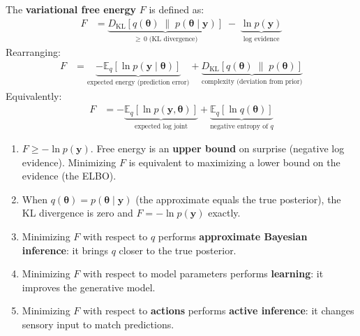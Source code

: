 \documentclass[11pt,a4paper]{report}
\begin{document}
\begin{definitionbox}
The \textbf{variational free energy} $F$ is defined as:
\begin{align}
  F &= \underbrace{D_{\mathrm{KL}}\!\left[q(\boldsymbol{\theta}) \;\|\; p(\boldsymbol{\theta} \mid \mathbf{y})\right]}_{\geq\, 0\; \text{(KL divergence)}} \;-\; \underbrace{\ln p(\mathbf{y})}_{\text{log evidence}} \label{eq:fe_def}
\end{align}
Rearranging:
\begin{align}
  F &= \underbrace{-\mathbb{E}_{q}\!\left[\ln p(\mathbf{y} \mid \boldsymbol{\theta})\right]}_{\text{expected energy (prediction error)}} + \underbrace{D_{\mathrm{KL}}\!\left[q(\boldsymbol{\theta}) \;\|\; p(\boldsymbol{\theta})\right]}_{\text{complexity (deviation from prior)}} \label{eq:fe_decomp}
\end{align}
Equivalently:
\begin{align}
  F &= -\underbrace{\mathbb{E}_{q}\!\left[\ln p(\mathbf{y}, \boldsymbol{\theta})\right]}_{\text{expected log joint}} + \underbrace{\mathbb{E}_{q}\!\left[\ln q(\boldsymbol{\theta})\right]}_{\text{negative entropy of }q} \label{eq:fe_alt}
\end{align}
\end{definitionbox}

\begin{principlebox}
\begin{enumerate}[leftmargin=1.5em]
  \item $F \geq -\ln p(\mathbf{y})$. Free energy is an \textbf{upper bound} on surprise (negative log evidence). Minimizing $F$ is equivalent to maximizing a lower bound on the evidence (the ELBO).
  \item When $q(\boldsymbol{\theta}) = p(\boldsymbol{\theta} \mid \mathbf{y})$ (the approximate equals the true posterior), the KL divergence is zero and $F = -\ln p(\mathbf{y})$ exactly.
  \item Minimizing $F$ with respect to $q$ performs \textbf{approximate Bayesian inference}: it brings $q$ closer to the true posterior.
  \item Minimizing $F$ with respect to model parameters performs \textbf{learning}: it improves the generative model.
  \item Minimizing $F$ with respect to \textbf{actions} performs \textbf{active inference}: it changes sensory input to match predictions.
\end{enumerate}
\end{principlebox}
\end{document}
